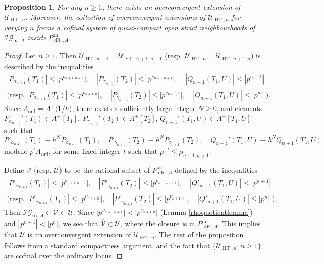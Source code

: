 \documentclass[10pt, oneside]{amsart}
\numberwithin{equation}{subsection}
\newtheorem{proposition}[equation]{Proposition}
\theoremstyle{definition}
\theoremstyle{remark}
\newcommand{\opn}[1]{\operatorname{#1}}
\begin{document}
\begin{proposition} \label{PropositionOCneighbourhoods}
For any $n \geq 1$, there exists an overconvergent extension of $\mathcal{U}_{\opn{HT}, n}$. Moreover, the collection of overconvergent extensions of $\mathcal{U}_{\opn{HT}, n}$ for varying $n$ forms a cofinal system of quasi-compact open strict neighbourhoods of $\mathcal{IG}_{\infty, A}$ inside $P_{\opn{dR}, A}^{\opn{an}}$.
\end{proposition}
\begin{proof}
Let $n \geq 1$. Then $\mathcal{U}_{\opn{HT}, n+1} = \mathcal{U}_{\opn{HT}, n+1, n+1}$ (resp. $\mathcal{U}_{\opn{HT}, n} = \mathcal{U}_{\opn{HT}, n+1, n}$) is described by the inequalities
\begin{align*}
|P_{\alpha_{n+1}}(T_1)| \leq |p^{\nu_{n+1, n+1}}|, \quad |P_{\gamma_{n+1}}(T_2)| \leq |p^{\nu_{n+1, n+1}}|, \quad |Q_{n+1}(T_1, U)| \leq |p^{n+1}| \\
\text{(resp. }  |P_{\alpha_{n+1}}(T_1)| \leq |p^{\nu_{n+1, n}}|, \quad |P_{\gamma_{n+1}}(T_2)| \leq |p^{\nu_{n+1, n}}|, \quad |Q_{n+1}(T_1, U)| \leq |p^{n}| \text{ ).}
\end{align*}
Since $A_{\opn{ord}}^+ = A^+\langle 1/h \rangle$, there exists a sufficiently large integer $N \geq 0$, and elements $P_{\alpha_{n+1}}'(T_1) \in A^+[T_1]$, $P_{\gamma_{n+1}}'(T_2) \in A^+[T_2]$, $Q_{n+1}'(T_1, U) \in A^+[T_1, U]$ such that
\[
P'_{\alpha_{n+1}}(T_1) \equiv h^N P_{\alpha_{n+1}}(T_1), \quad P'_{\gamma_{n+1}}(T_2) \equiv h^N P_{\gamma_{n+1}}(T_2), \quad Q_{n+1}'(T_1, U) \equiv h^N Q_{n+1}(T_1, U)
\]
modulo $p^{t}A_{\opn{ord}}^+$, for some fixed integer $t$ such that $p^{-t} \leq \rho_{n+1, n+1}$.

Define $\mathcal{V}$ (resp. $\mathcal{U}$) to be the rational subset of $P_{\opn{dR}, A}^{\opn{an}}$ defined by the inequalities 
\begin{align*}
    |P'_{\alpha_{n+1}}(T_1)| \leq |p^{\nu_{n+1, n+1}}|, \quad |P'_{\gamma_{n+1}}(T_2)| \leq |p^{\nu_{n+1, n+1}}|, \quad |Q'_{n+1}(T_1, U)| \leq |p^{n+1}| \\
    \text{(resp. } |P'_{\alpha_{n+1}}(T_1)| \leq |p^{\nu_{n+1, n}}|, \quad |P'_{\gamma_{n+1}}(T_2)| \leq |p^{\nu_{n+1, n}}|, \quad |Q'_{n+1}(T_1, U)| \leq |p^{n}| \text{ ).}
\end{align*}
Then $\mathcal{IG}_{\infty, A} \subset \mathcal{V} \subset \mathcal{U}$. Since $|p^{\nu_{n+1, n+1}}| < |p^{\nu_{n+1, n}}|$ (Lemma \ref{rhoquotientlemma}) and $|p^{n+1}| < |p^{n}|$, we see that $\overline{\mathcal{V}} \subset \mathcal{U}$, where the closure is in $P_{\opn{dR}, A}^{\opn{an}}$. This implies that $\mathcal{U}$ is an overconvergent extension of $\mathcal{U}_{\opn{HT}, n}$. The rest of the proposition follows from a standard compactness argument, and the fact that $\{\mathcal{U}_{\opn{HT}, n}: n \geq 1\}$ are cofinal over the ordinary locus.
\end{proof}
\end{document}
